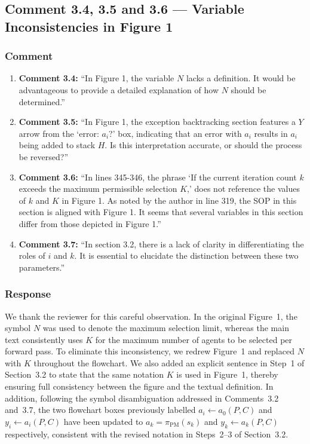 \documentclass[11pt,a4paper]{article}
\begin{document}
\subsection{Comment 3.4, 3.5 and 3.6 --- Variable Inconsistencies in Figure 1}

\subsubsection{Comment}
\begin{enumerate}
\item \textbf{Comment 3.4: } ``In Figure 1, the variable $N$ lacks a definition. It would be advantageous to provide a detailed explanation of how $N$ should be determined.''
\item \textbf{Comment 3.5: } ``In Figure 1, the exception backtracking section features a $Y$ arrow from the `error: $a_i$?' box, indicating that an error with $a_i$ results in $a_i$ being added to stack $H$. Is this interpretation accurate, or should the process be reversed?''
\item \textbf{Comment 3.6: } ``In lines 345-346, the phrase `If the current iteration count $k$ exceeds the maximum permissible selection $K$,' does not reference the values of $k$ and $K$ in Figure 1. As noted by the author in line 319, the SOP in this section is aligned with Figure 1. It seems that several variables in this section differ from those depicted in Figure 1.''
\item \textbf{Comment 3.7: } ``In section 3.2, there is a lack of clarity in differentiating the roles of $i$ and $k$. It is essential to elucidate the distinction between these two parameters.''

\end{enumerate}

\subsubsection{Response}
We thank the reviewer for this careful observation. In the original Figure~1, the symbol $N$ was used to denote the maximum selection limit, whereas the main text consistently uses $K$ for the maximum number of agents to be selected per forward pass. To eliminate this inconsistency, we redrew Figure~1 and replaced $N$ with $K$ throughout the flowchart. We also added an explicit sentence in Step~1 of Section~3.2 to state that the same notation $K$ is used in Figure~1, thereby ensuring full consistency between the figure and the textual definition. In addition, following the symbol disambiguation addressed in Comments~3.2 and~3.7, the two flowchart boxes previously labelled $a_i \leftarrow a_0(P,C)$ and $y_i \leftarrow a_i(P,C)$ have been updated to $a_k = \pi_{\mathrm{PM}}(s_k)$ and $y_k \leftarrow a_k(P,C)$ respectively, consistent with the revised notation in Steps~2--3 of Section~3.2.
\end{document}
